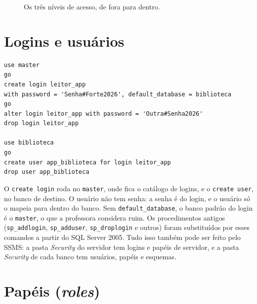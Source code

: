 \begin{figure}[h]
\centering
{}
\caption{Os três níveis de acesso, de fora para dentro.}
\end{figure}

\section{Logins e usuários}

\begin{lstlisting}
use master
go
create login leitor_app
with password = 'Senha#Forte2026', default_database = biblioteca
go
alter login leitor_app with password = 'Outra#Senha2026'
drop login leitor_app

use biblioteca
go
create user app_biblioteca for login leitor_app
drop user app_biblioteca
\end{lstlisting}

O \texttt{create login} roda no \texttt{master}, onde fica o catálogo
de logins, e o \texttt{create user}, no banco de destino. O usuário não
tem senha: a senha é do login, e o usuário só o mapeia para dentro do
banco. Sem \texttt{default\_database}, o banco padrão do login é o
\texttt{master}, o que a professora considera ruim. Os procedimentos antigos (\texttt{sp\_addlogin},
\texttt{sp\_adduser}, \texttt{sp\_droplogin} e outros) foram substituídos
por esses comandos a partir do SQL Server 2005. Tudo isso também pode ser
feito pelo SSMS: a pasta \emph{Security} do servidor tem logins e papéis
de servidor, e a pasta \emph{Security} de cada banco tem usuários,
papéis e esquemas.

\section{Papéis (\emph{roles})}

